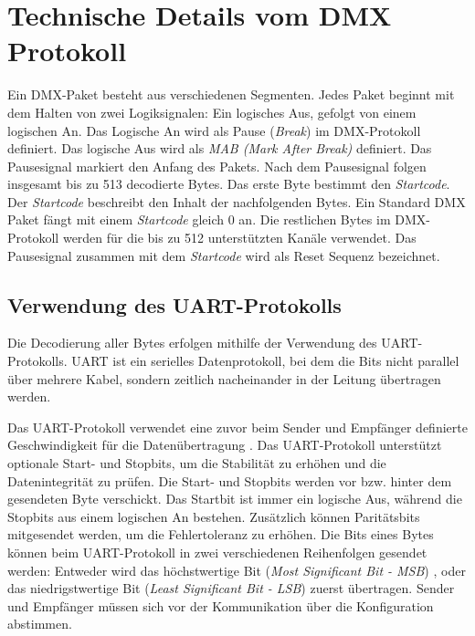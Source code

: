 \chapter{Technische Details vom DMX Protokoll}

Ein DMX-Paket besteht aus verschiedenen Segmenten. Jedes Paket beginnt mit dem Halten von zwei Logiksignalen: Ein logisches Aus, gefolgt von einem logischen An. Das Logische An wird als Pause (\emph{Break}) im DMX-Protokoll definiert. Das logische Aus wird als \emph{MAB (Mark After Break)} definiert\cite[S.17]{DMX512-Protocol-Standard}. Das Pausesignal markiert den Anfang des Pakets. Nach dem Pausesignal folgen insgesamt bis zu 513 decodierte Bytes. Das erste Byte bestimmt den \emph{Startcode}. Der \emph{Startcode} beschreibt den Inhalt der nachfolgenden Bytes. Ein Standard DMX Paket fängt mit einem \emph{Startcode} gleich 0 an. Die restlichen Bytes im DMX-Protokoll werden für die bis zu 512 unterstützten Kanäle verwendet\cite[S.14]{DMX512-Protocol-Standard}. Das Pausesignal zusammen mit dem \emph{Startcode} wird als Reset Sequenz bezeichnet\cite[S.17]{DMX512-Protocol-Standard}.

\section{Verwendung des UART-Protokolls}

Die Decodierung aller Bytes erfolgen mithilfe der Verwendung des UART-Protokolls. UART ist ein serielles Datenprotokoll, bei dem die Bits nicht parallel über mehrere Kabel, sondern zeitlich nacheinander in der Leitung übertragen werden\cite[S.1]{UartStandard}.

Das UART-Protokoll verwendet eine zuvor beim Sender und Empfänger definierte Geschwindigkeit für die Datenübertragung \cite[S.2]{UartStandard}.  Das UART-Protokoll unterstützt optionale Start- und Stopbits, um die Stabilität zu erhöhen und die Datenintegrität zu prüfen\cite[S.2]{UartStandard}. Die Start- und Stopbits werden vor bzw. hinter dem gesendeten Byte verschickt. Das Startbit ist immer ein logische Aus, während die Stopbits aus einem logischen An bestehen\cite[S.2]{UartStandard}. Zusätzlich können Paritätsbits mitgesendet werden, um die Fehlertoleranz zu erhöhen\cite[S.2]{UartStandard}. Die Bits eines Bytes können beim UART-Protokoll in zwei verschiedenen Reihenfolgen gesendet werden: Entweder wird das
höchstwertige Bit (\emph{Most Significant Bit - MSB}) , oder das niedrigstwertige Bit (\emph{Least Significant Bit - LSB}) zuerst übertragen\cite[S.2]{UartStandard}. Sender und Empfänger müssen sich vor der Kommunikation über die Konfiguration abstimmen.


